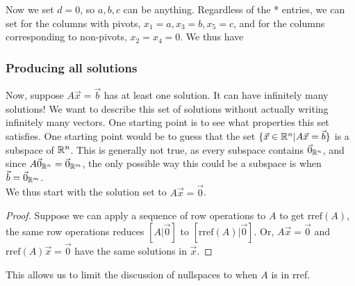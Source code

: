 Now we set $d=0$, so $a,b,c$ can be anything.
Regardless of the * entries, we can set for the columns with pivots, $x_1=a, x_3=b, x_5=c$, 
and for the columns corresponding to non-pivots, $x_2=x_4=0$. We thus have


\subsubsection*{Producing all solutions}
Now, suppose $A\vec{x}=\vec{b}$ has at least one solution. It can have infinitely many solutions! We want to describe this set of solutions without actually
writing infinitely many vectors. One starting point is to see what properties this set satisfies. One starting point 
would be to guess that the set $\{\vec{x}\in\mathbb{R}^n | A\vec{x}=\vec{b}\}$ is a subspace of $\mathbb{R}^n$.
This is generally not true, as every subspace contains $\vec{0}_{\mathbb{R}^n}$, and since $A\vec{0}_{\mathbb{R}^n}=\vec{0}_{\mathbb{R}^m}$,
the only possible way this could be a subspace is when $\vec{b}=\vec{0}_{\mathbb{R}^m}$.\\

We thus start with the solution set to $A\vec{x}=\vec{0}$.
\begin{proof}
	Suppose we can apply a sequence of row operations to $A$ to get $\textrm{rref}(A)$, the same row operations reduces $[A|\vec{0}]$ to $[\textrm{rref}(A)|\vec{0}]$. Or, $A\vec{x}=\vec{0}$ and $\textrm{rref}(A)\vec{x}=\vec{0}$ have the same solutions in $\vec{x}$.
\end{proof}
This allows us to limit the discussion of nullspaces to when $A$ is in rref.

